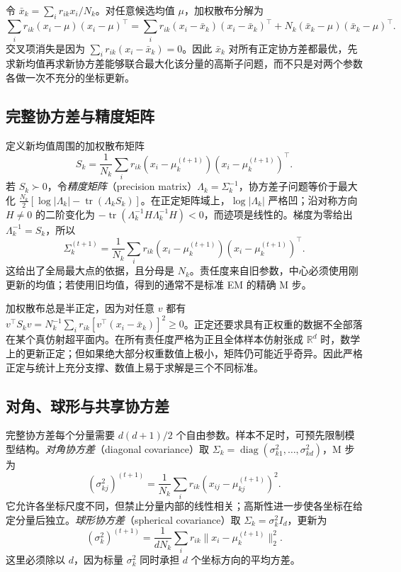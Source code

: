 \documentclass[UTF8,12pt,a4paper,fontset=fandol]{ctexart}
\begin{document}
令 $\bar x_k=\sum_i r_{ik}x_i/N_k$。对任意候选均值 $\mu$，加权散布分解为
\[
\sum_i r_{ik}(x_i-\mu)(x_i-\mu)^\top
=\sum_i r_{ik}(x_i-\bar x_k)(x_i-\bar x_k)^\top
+N_k(\bar x_k-\mu)(\bar x_k-\mu)^\top.
\]
交叉项消失是因为 $\sum_i r_{ik}(x_i-\bar x_k)=0$。因此 $\bar x_k$ 对所有正定协方差都最优，先求新均值再求新协方差能够联合最大化该分量的高斯子问题，而不只是对两个参数各做一次不充分的坐标更新。

\subsection{完整协方差与精度矩阵}
定义新均值周围的加权散布矩阵
\[
S_k=\frac1{N_k}\sum_i r_{ik}(x_i-\mu_k^{(t+1)})(x_i-\mu_k^{(t+1)})^\top.
\]
若 $S_k\succ0$，令\emph{精度矩阵}（precision matrix）$\Lambda_k=\Sigma_k^{-1}$，协方差子问题等价于最大化 $\tfrac{N_k}{2}[\log|\Lambda_k|-\operatorname{tr}(\Lambda_kS_k)]$。在正定矩阵域上，$\log|\Lambda_k|$ 严格凹；沿对称方向 $H\neq0$ 的二阶变化为 $-\operatorname{tr}(\Lambda_k^{-1}H\Lambda_k^{-1}H)<0$，而迹项是线性的。梯度为零给出 $\Lambda_k^{-1}=S_k$，所以
\begin{equation}
\Sigma_k^{(t+1)}=\frac1{N_k}\sum_i r_{ik}
(x_i-\mu_k^{(t+1)})(x_i-\mu_k^{(t+1)})^\top.
\label{eq:gmm-cov-update}
\end{equation}
这给出了全局最大点的依据，且分母是 $N_k$。责任度来自旧参数，中心必须使用刚更新的均值；若使用旧均值，得到的通常不是标准 EM 的精确 M 步。

加权散布总是半正定，因为对任意 $v$ 都有 $v^\top S_kv=N_k^{-1}\sum_i r_{ik}[v^\top(x_i-\bar x_k)]^2\geq0$。正定还要求具有正权重的数据不全部落在某个真仿射超平面内。在所有责任度严格为正且全体样本仿射张成 $\mathbb R^d$ 时，数学上的更新正定；但如果绝大部分权重数值上极小，矩阵仍可能近乎奇异。因此严格正定与统计上充分支撑、数值上易于求解是三个不同标准。

\subsection{对角、球形与共享协方差}
完整协方差每个分量需要 $d(d+1)/2$ 个自由参数。样本不足时，可预先限制模型结构。\emph{对角协方差}（diagonal covariance）取 $\Sigma_k=\operatorname{diag}(\sigma_{k1}^2,\ldots,\sigma_{kd}^2)$，M 步为
\[
(\sigma_{kj}^2)^{(t+1)}=\frac1{N_k}\sum_i r_{ik}(x_{ij}-\mu_{kj}^{(t+1)})^2.
\]
它允许各坐标尺度不同，但禁止分量内部的线性相关；高斯性进一步使各坐标在给定分量后独立。\emph{球形协方差}（spherical covariance）取 $\Sigma_k=\sigma_k^2I_d$，更新为
\[
(\sigma_k^2)^{(t+1)}=\frac1{dN_k}\sum_i r_{ik}\|x_i-\mu_k^{(t+1)}\|_2^2.
\]
这里必须除以 $d$，因为标量 $\sigma_k^2$ 同时承担 $d$ 个坐标方向的平均方差。
\end{document}
